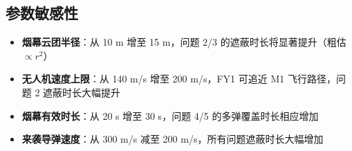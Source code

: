 \subsection{参数敏感性}

\begin{itemize}
  \item \textbf{烟幕云团半径}：从 10 m 增至 15 m，问题 2/3 的遮蔽时长将显著提升（粗估 $\propto r^2$）
  \item \textbf{无人机速度上限}：从 140 m/s 增至 200 m/s，FY1 可追近 M1 飞行路径，问题 2 遮蔽时长大幅提升
  \item \textbf{烟幕有效时长}：从 20 s 增至 30 s，问题 4/5 的多弹覆盖时长相应增加
  \item \textbf{来袭导弹速度}：从 300 m/s 减至 200 m/s，所有问题遮蔽时长大幅增加
\end{itemize}
